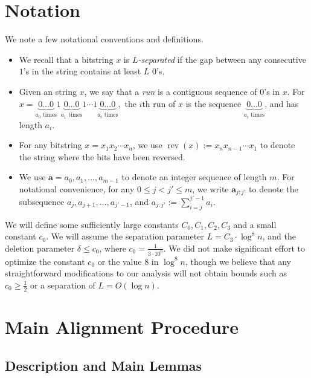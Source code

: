 \documentclass[12pt]{article}
\theoremstyle{definition}
\theoremstyle{remark}
\DeclareMathOperator{\rev}{rev}
\newcommand{\ba}{\mathbf a}
\begin{document}
\section{Notation}\label{sec:notation}

We note a few notational conventions and definitions.

\begin{itemize}
    \item We recall that a bitstring $x$ is \emph{$L$-separated} if the gap between any consecutive $1$'s in the string contains at least $L$ $0$'s.
    \item Given an string $x$, we say that a \emph{run} is a contiguous sequence of $0$'s in $x$. For $x = \underbrace{0 \dots 0}_{a_0 \text{ times}} 1 \underbrace{0 \dots 0}_{a_1 \text{ times}} 1 \cdots 1 \underbrace{0 \dots 0}_{a_{t} \text{ times}},$ the $i$th run of $x$ is the sequence $\underbrace{0 \dots 0}_{a_i \text{ times}}$, and has length $a_i$.
    \item For any bitstring $x = x_1 x_2 \cdots x_n$, we use $\rev(x) := x_n x_{n-1} \cdots x_1$ to denote the string where the bits have been reversed.
    \item We use $\ba = a_0, a_1, \dots, a_{m-1}$ to denote an integer sequence of length $m$. For notational convenience, for any $0 \le j < j' \le m$, we write $\ba_{j:j'}$ to denote the subsequence $a_{j}, a_{j+1}, \dots, a_{j'-1}$, and $a_{j:j'} := \sum_{i = j}^{j'-1} a_i$.
\end{itemize}

We will define some sufficiently large constants $C_0, C_1, C_2, C_3$ and a small constant $c_0$. We will assume the separation parameter $L = C_3 \cdot \log^8 n$, and the deletion parameter $\delta \le c_0$, where $c_0 = \frac{1}{3 \cdot 10^6}$. We did not make significant effort to optimize the constant $c_0$ or the value $8$ in $\log^8 n$, though we believe that any straightforward modifications to our analysis will not obtain bounds such as $c_0 \ge \frac{1}{2}$ or a separation of $L = O(\log n)$.


\section{Main Alignment Procedure} \label{sec:main-process}

\subsection{Description and Main Lemmas} \label{sec:main-process-description}
\end{document}
